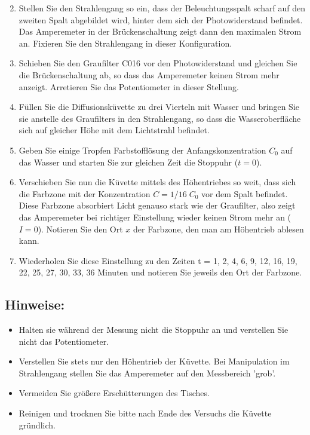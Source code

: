 \begin{enumerate} \setcounter{enumi}{1}
 \item Stellen Sie den Strahlengang so ein, dass der Beleuchtungsspalt scharf auf den zweiten Spalt abgebildet wird, hinter dem sich der Photowiderstand befindet. Das Amperemeter in der Brückenschaltung zeigt dann den maximalen Strom an. Fixieren Sie den Strahlengang in dieser Konfiguration.
 \item Schieben Sie den Graufilter C016 vor den Photowiderstand und gleichen Sie die Brückenschaltung ab, so dass das Amperemeter keinen Strom mehr anzeigt. Arretieren Sie das Potentiometer in dieser Stellung.
 \item Füllen Sie die Diffusionsküvette zu drei Vierteln mit Wasser und bringen Sie sie anstelle des Graufilters in den Strahlengang, so dass die Wasseroberfläche sich auf gleicher Höhe mit dem Lichtstrahl befindet.
 \item Geben Sie einige Tropfen Farbstofflösung der Anfangskonzentration $C_0$ auf das Wasser und starten Sie zur gleichen Zeit die Stoppuhr ($t=0$).
 \item Verschieben Sie nun die Küvette mittels des Höhentriebes so weit, dass sich die Farbzone mit der Konzentration $C = 1/16\; C_0$ vor dem Spalt befindet.\\
  Diese Farbzone absorbiert Licht genauso stark wie der Graufilter, also zeigt das Amperemeter bei richtiger Einstellung wieder keinen Strom mehr an ($I = 0$). Notieren Sie den Ort $x$ der Farbzone, den man am Höhentrieb ablesen kann.
 \item Wiederholen Sie diese Einstellung zu den Zeiten t = 1, 2, 4, 6, 9, 12, 16, 19, 22, 25, 27, 30, 33, 36 Minuten und notieren Sie jeweils den Ort der Farbzone.
\end{enumerate}

\subsection*{Hinweise:}
\begin{itemize}
 \item Halten sie während der Messung nicht die Stoppuhr an und verstellen Sie nicht das Potentiometer.
 \item Verstellen Sie stets nur den Höhentrieb der Küvette. Bei Manipulation im Strahlengang stellen Sie das Amperemeter auf den Messbereich 'grob'.
 \item Vermeiden Sie größere Erschütterungen des Tisches.
 \item Reinigen und trocknen Sie bitte nach Ende des Versuchs die Küvette gründlich.
\end{itemize}

